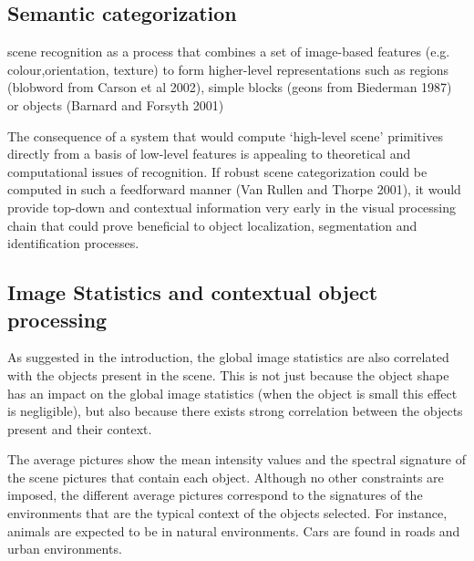 \documentclass{article}
\begin{document}
\subsection{Semantic categorization}
scene recognition as a process that combines a set of image-based features (e.g. colour,orientation, texture) to form higher-level representations such as regions (blobword from Carson et al 2002), simple blocks (geons from Biederman 1987) or objects (Barnard and Forsyth 2001)

The consequence of a system that would compute ‘high-level scene’ primitives directly from a basis of low-level features is appealing to theoretical and computational issues of recognition. If robust scene categorization could be computed in such a feedforward manner (Van Rullen and Thorpe 2001), it would provide top-down and contextual information very early in the visual processing chain that could prove beneficial to object localization, segmentation and identification processes. 

\subsection{Image Statistics and contextual object processing} 

As suggested in the introduction, the global image statistics are also correlated with the objects present in the scene. This is not just because the object shape has an impact on the global image statistics (when the object is small this effect is negligible), but also because there exists
strong correlation between the objects present and their context.

 The average pictures show the mean intensity values and the spectral signature of the scene pictures that contain each object. Although no other constraints are imposed, the different average pictures correspond
to the signatures of the environments that are the typical context of the objects selected. For instance, animals are expected to be in natural environments. Cars are found in roads and urban environments.  
\end{document}
